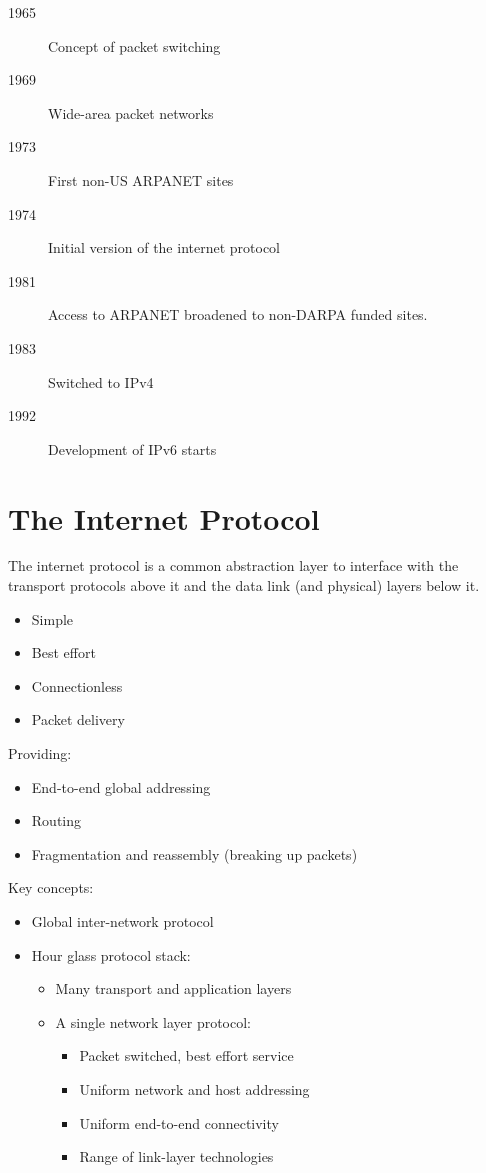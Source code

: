 \begin{description}
    \item[1965] Concept of packet switching
    \item[1969] Wide-area packet networks
    \item[1973] First non-US ARPANET sites
    \item[1974] Initial version of the internet protocol
    \item[1981] Access to ARPANET broadened to non-DARPA funded sites.
    \item[1983] Switched to IPv4
    \item[1992] Development of IPv6 starts
\end{description}

\section{The Internet Protocol}\label{sec:the_internet_protocol}

The internet protocol is a common abstraction layer to interface with the transport protocols above it and the data link (and physical) layers below it.
\begin{itemize}
    \item Simple
    \item Best effort
    \item Connectionless
    \item Packet delivery
\end{itemize}
Providing:
\begin{itemize}
    \item End-to-end global addressing
    \item Routing
    \item Fragmentation and reassembly (breaking up packets)
\end{itemize}
Key concepts:
\begin{itemize}
    \item Global inter-network protocol
    \item Hour glass protocol stack:
          \begin{itemize}
              \item Many transport and application layers
              \item A single network layer protocol:
                    \begin{itemize}
                        \item Packet switched, best effort service
                        \item Uniform network and host addressing
                        \item Uniform end-to-end connectivity
                        \item Range of link-layer technologies
                    \end{itemize}
          \end{itemize}
\end{itemize}

